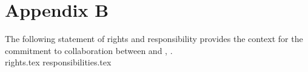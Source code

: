 \newpage
\section{Appendix B}
{
    The following statement of rights and responsibility provides the context for
    the commitment to collaboration between {\TeamName} and {\ClientName},
    {\ClientOrganization}. \\

    {rights.tex}
    {responsibilities.tex}
}